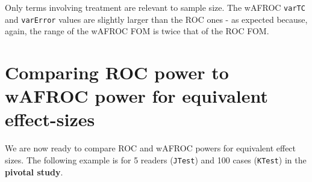 \documentclass[
]{book}
\begin{document}
Only terms involving treatment are relevant to sample size. The wAFROC \texttt{varTC} and \texttt{varError} values are slightly larger than the ROC ones - as expected because, again, the range of the wAFROC FOM is twice that of the ROC FOM.

\hypertarget{comparing-roc-power-to-wafroc-power-for-equivalent-effect-sizes}{%
\section{Comparing ROC power to wAFROC power for equivalent effect-sizes}\label{comparing-roc-power-to-wafroc-power-for-equivalent-effect-sizes}}

We are now ready to compare ROC and wAFROC powers for equivalent effect sizes. The following example is for 5 readers (\texttt{JTest}) and 100 cases (\texttt{KTest}) in the \textbf{pivotal study}.
\end{document}
